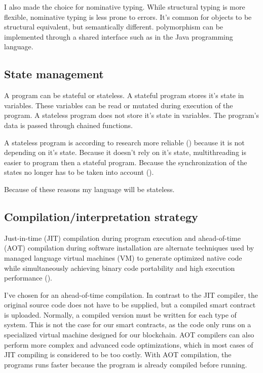 \documentclass{uva-inf-article}
\begin{document}
\par I also made the choice for nominative typing. 
While structural typing is more flexible, nominative typing is less prone to errors.
It's common for objects to be structural equivalent, but semantically different.
polymorphism can be implemented through a shared interface such as in the Java programming language.

\subsection{State management}
\par A program can be stateful or stateless. A stateful program stores it's state in variables.
These variables can be read or mutated during execution of the program.
A stateless program does not store it's state in variables. 
The program's data is passed through chained functions. 

\par A stateless program is according to research more reliable (\cite{Merelo}) because it is not depending on it's state.
Because it doesn't rely on it's state, multithreading is easier to program then a stateful program. 
Because the synchronization of the states no longer has to be taken into account (\cite{Merelo}).

\par Because of these reasons my language will be stateless.

\subsection{Compilation/interpretation strategy}
\par Just-in-time (JIT) compilation during program execution and ahead-of-time (AOT) compilation during 
software installation are alternate techniques used by managed language virtual machines (VM) to 
generate optimized native code while simultaneously achieving binary code portability and 
high execution performance (\cite{wade2017aot}).

\par I've chosen for an ahead-of-time compilation. In contrast to the JIT compiler, 
the original source code does not have to be supplied, but a compiled smart contract is uploaded.
Normally, a compiled version must be written for each type of system. 
This is not the case for our smart contracts, as the code only runs on a specialized virtual machine 
designed for our blockchain. AOT compilers can also perform more complex and advanced code optimizations,
which in most cases of JIT compiling is considered to be too costly.
With AOT compilation, the programs runs faster because the program is already compiled before running.
\end{document}

